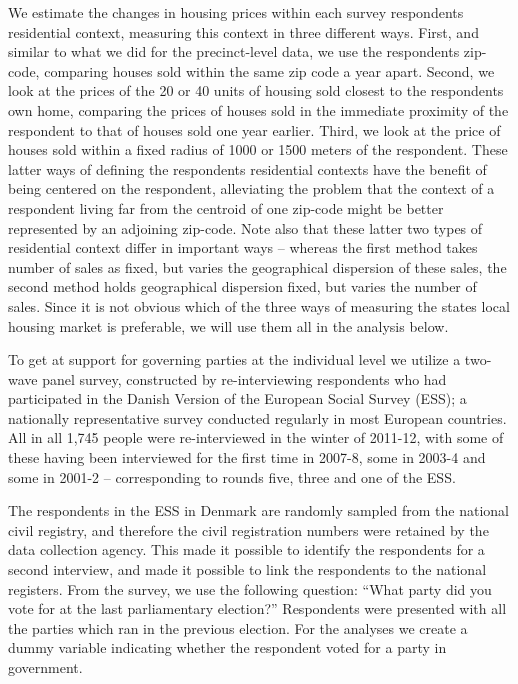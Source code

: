 \documentclass[12pt,a4paper]{article}
\begin{document}
We estimate the changes in housing prices within each survey respondents residential context, measuring this context  in three different ways. First, and similar to what we did for the precinct-level data, we use the respondents zip-code, comparing houses sold within the same zip code a year apart. Second, we look at the prices of the 20 or 40 units of housing sold closest to the respondents own home, comparing the prices of houses sold in the immediate proximity of the respondent to that of houses sold one year earlier. Third, we look at the price of houses sold within a fixed radius of 1000 or 1500 meters of the respondent. These latter ways of defining the respondents residential contexts have the benefit of being centered on the respondent, alleviating the problem that the context of a respondent living far from the centroid of one zip-code might be better represented by an adjoining zip-code. Note also that these latter two types of residential context differ in important ways -- whereas the first method takes number of sales as fixed, but varies the geographical dispersion of these sales, the second method holds geographical dispersion fixed, but varies the number of sales. Since it is not obvious which of the three ways of measuring the states local housing market is preferable, we will use them all in the analysis below.

To get at support for governing parties at the individual level we utilize a two-wave panel survey, constructed by re-interviewing respondents who had participated in the Danish Version of the European Social Survey (ESS);  a nationally representative survey conducted regularly in most European countries. All in all 1,745 people were re-interviewed in the winter of 2011-12, with some of these having been interviewed for the first time in 2007-8, some in 2003-4 and some in 2001-2 -- corresponding to rounds five, three and one of the ESS. 

The respondents in the ESS in Denmark are randomly sampled from the national civil registry, and therefore the civil registration numbers were retained by the data collection agency. This made it possible to identify the respondents for a second interview, and made it possible to link the respondents to the national registers. From the survey, we use the following question: ``What party did you vote for at the last parliamentary election?'' Respondents were presented with all the parties which ran in the previous election. For the analyses we create a dummy variable indicating whether the respondent voted for a party in government. 
\end{document}

